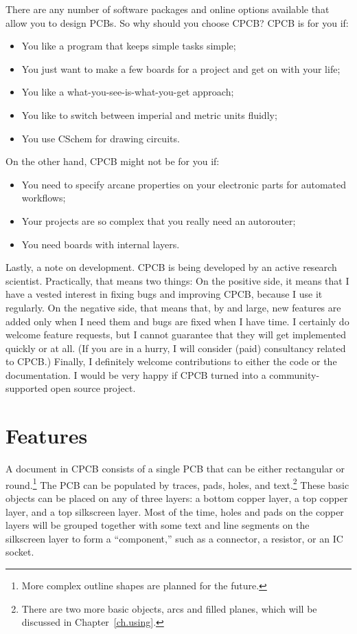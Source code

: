 \documentclass[11pt]{report}
\begin{document}
There are any number of software packages and online options available
that allow you to design PCBs. So why should you choose CPCB? CPCB is
for you if:
\begin{itemize}
\item You like a program that keeps simple tasks simple;
\item You just want to make a few boards for a project and get on
  with your life;
\item You like a what-you-see-is-what-you-get approach;
\item You like to switch between imperial and metric units fluidly;
\item You use CSchem for drawing circuits.        
\end{itemize}
%
On the other hand, CPCB might not be for you if:
\begin{itemize}
  \item You need to specify arcane properties on
  your electronic parts for automated workflows;
\item Your projects are so complex that you really need an
  autorouter;
\item You need boards with internal layers.
\end{itemize}
%
Lastly, a note on development. CPCB is being developed by an
active research scientist. Practically, that means two things: On the
positive side, it means that I have a vested interest in fixing bugs
and improving CPCB, because I use it regularly. On the negative side, that
means that, by and large, new features are added only when I need them
and bugs are fixed when I have time. I certainly do welcome feature
requests, but I cannot guarantee that they will get implemented
quickly or at all. (If you are in a hurry, I will consider (paid)
consultancy related to CPCB.) Finally, I definitely welcome
contributions to either the code or the documentation. I would be very
happy if CPCB turned into a community-supported open source project.

\section{Features}

A document in CPCB consists of a single PCB that can be either
rectangular or round.\footnote{More complex outline shapes are planned
  for the future.} The PCB can be populated by traces, pads, holes,
and text.\footnote{There are two more basic objects, arcs and filled
  planes, which will be discussed in  Chapter~\ref{ch.using}.} These basic
objects can be placed on any of three layers: a bottom copper layer, a
top copper layer, and a top silkscreen layer. Most of the time, holes
and pads on the copper layers will be grouped together with some text
and line segments on the silkscreen layer to form a ``component,''
such as a connector, a resistor, or an IC socket.
\end{document}

